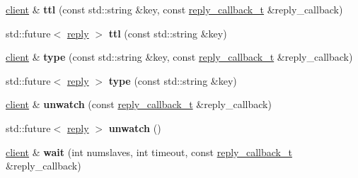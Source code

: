 \begin{DoxyCompactItemize}
\mbox{\label{classcpp__redis_1_1client_a667bb7a6ead9c8cdaba534033a467367}} 
\mbox{\hyperlink{classcpp__redis_1_1client}{client}} \& {\bfseries ttl} (const std\+::string \&key, const \mbox{\hyperlink{classcpp__redis_1_1client_af7a65eb21aa25230bfbb0b0203c4fc04}{reply\+\_\+callback\+\_\+t}} \&reply\+\_\+callback)
\item 
\mbox{\label{classcpp__redis_1_1client_afc4697ccb77bb16ff13c425b93ef7c1d}} 
std\+::future$<$ \mbox{\hyperlink{classcpp__redis_1_1reply}{reply}} $>$ {\bfseries ttl} (const std\+::string \&key)
\item 
\mbox{\label{classcpp__redis_1_1client_ac284ea9a5c0e95d49a675403aaf4847c}} 
\mbox{\hyperlink{classcpp__redis_1_1client}{client}} \& {\bfseries type} (const std\+::string \&key, const \mbox{\hyperlink{classcpp__redis_1_1client_af7a65eb21aa25230bfbb0b0203c4fc04}{reply\+\_\+callback\+\_\+t}} \&reply\+\_\+callback)
\item 
\mbox{\label{classcpp__redis_1_1client_a143f362032218fef03b3408a761b8851}} 
std\+::future$<$ \mbox{\hyperlink{classcpp__redis_1_1reply}{reply}} $>$ {\bfseries type} (const std\+::string \&key)
\item 
\mbox{\label{classcpp__redis_1_1client_aaf19c28495b74c8c22a8d86e80a1557e}} 
\mbox{\hyperlink{classcpp__redis_1_1client}{client}} \& {\bfseries unwatch} (const \mbox{\hyperlink{classcpp__redis_1_1client_af7a65eb21aa25230bfbb0b0203c4fc04}{reply\+\_\+callback\+\_\+t}} \&reply\+\_\+callback)
\item 
\mbox{\label{classcpp__redis_1_1client_a006e1258d7857f2d83bd9be48945f79a}} 
std\+::future$<$ \mbox{\hyperlink{classcpp__redis_1_1reply}{reply}} $>$ {\bfseries unwatch} ()
\item 
\mbox{\label{classcpp__redis_1_1client_ab7e11ccc1fb07ae3dce860042b96f4d9}} 
\mbox{\hyperlink{classcpp__redis_1_1client}{client}} \& {\bfseries wait} (int numslaves, int timeout, const \mbox{\hyperlink{classcpp__redis_1_1client_af7a65eb21aa25230bfbb0b0203c4fc04}{reply\+\_\+callback\+\_\+t}} \&reply\+\_\+callback)
\item 

\end{DoxyCompactItemize}
